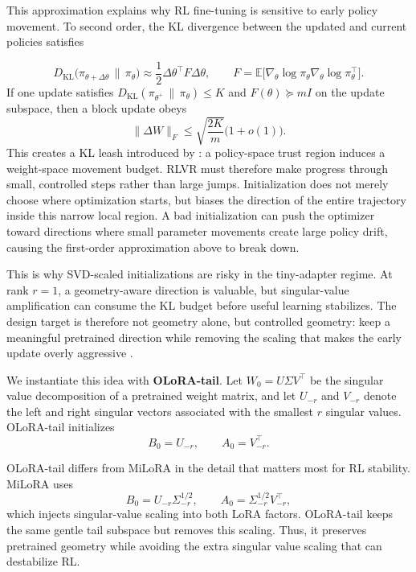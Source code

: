 \documentclass{llmxive}
\begin{document}
This approximation explains why RL fine-tuning is sensitive to early policy movement. To second
order, the KL divergence between the updated and current policies satisfies \citep{zhu2025pathtakenrlvrprovably}

\[
    D_{\mathrm{KL}}
    \bigl(
        \pi_{\theta+\Delta\theta}
        \,\|\,
        \pi_\theta
    \bigr)
    \approx
    \frac{1}{2}
    \Delta\theta^\top F\Delta\theta,
    \qquad
    F=
    \mathbb{E}
    \bigl[
        \nabla_\theta\log\pi_\theta
        \nabla_\theta\log\pi_\theta^\top
    \bigr].
\]
If one update satisfies
\(D_{\mathrm{KL}}(\pi_{\theta^+}\,\|\,\pi_\theta)\le K\) and
\(F(\theta)\succeq mI\) on the update subspace, then a block update obeys
\[
    \|\Delta W\|_F
    \le
    \sqrt{\frac{2K}{m}}
    \bigl(1+o(1)\bigr).
\]
This creates a KL leash introduced by \citep{zhu2025pathtakenrlvrprovably}: a policy-space trust region induces a weight-space movement budget.
RLVR must therefore make progress through small, controlled steps rather than large jumps.
Initialization does not merely choose where optimization starts, but biases the direction of the
entire trajectory inside this narrow local region. A bad initialization can push the optimizer
toward directions where small parameter movements create large policy drift, causing the
first-order approximation above to break down.

This is why SVD-scaled initializations are risky in the tiny-adapter regime. At rank \(r=1\), a
geometry-aware direction is valuable, but singular-value amplification can consume the KL
budget before useful learning stabilizes. The design target is therefore not geometry alone, but
controlled geometry: keep a meaningful pretrained direction while removing the scaling that
makes the early update overly aggressive \citep{zhang2026geometry}.



We instantiate this idea with \textbf{OLoRA-tail}. Let $ W_0 = U\Sigma V^\top$
be the singular value decomposition of a pretrained weight matrix, and let \(U_{-r}\) and
\(V_{-r}\) denote the left and right singular vectors associated with the smallest \(r\) singular
values. OLoRA-tail initializes
\[
    B_0 = U_{-r},
    \qquad
    A_0 = V_{-r}^{\top}.
\]

OLoRA-tail differs from MiLoRA in the detail that matters most for RL stability. MiLoRA uses
\[
    B_0 = U_{-r}\Sigma_{-r}^{1/2},
    \qquad
    A_0 = \Sigma_{-r}^{1/2}V_{-r}^{\top},
\]
which injects singular-value scaling into both LoRA factors. OLoRA-tail keeps the same gentle tail
subspace but removes this scaling. Thus, it preserves pretrained geometry while avoiding the
extra singular value scaling that can destabilize RL. 
\end{document}
